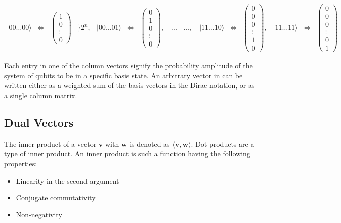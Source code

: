 \documentclass[12pt]{article}
\begin{document}
\begin{equation}
    \begin{array}{ccccccc}
    |00\ldots00\rangle & \Longleftrightarrow &
    \begin{pmatrix} 
    1 \\ 
    0 \\ 
    \vdots \\ 
    0
    \end{pmatrix} & \Bigg\} 2^n, &
    |00\ldots01\rangle & \Longleftrightarrow &
    \begin{pmatrix} 
    0 \\ 
    1 \\ 
    0 \\ 
    \vdots \\ 
    0
    \end{pmatrix}, \quad \ldots
    \end{array}

    \begin{array}{ccccccc}
    \ldots, \quad |11\ldots10\rangle & \Longleftrightarrow &
    \begin{pmatrix} 
    0 \\ 
    0 \\ 
    0 \\ 
    \vdots \\ 
    1 \\ 
    0
    \end{pmatrix}, &
    |11\ldots11\rangle & \Longleftrightarrow &
    \begin{pmatrix} 
    0 \\ 
    0 \\ 
    0 \\ 
    \vdots \\ 
    0 \\ 
    1
    \end{pmatrix}
    \end{array}
\end{equation}

Each entry in one of the column vectors signify the probability amplitude of the system of qubits to be in a specific basis state. An arbitrary vector in can be written either as a weighted sum of the basis vectors in the Dirac notation, or as a single column matrix.

\subsection{Dual Vectors}

\hspace*{0.5cm}The inner product of a vector \( \mathbf{v} \) with \( \mathbf{w} \) is denoted as \( \langle \mathbf{v}, \mathbf{w} \rangle \). Dot products are a type of inner product.
An inner product is such a function having the following properties:
\begin{itemize}[nosep]
    \item Linearity in the second argument
    \item Conjugate commutativity
    \item Non-negativity
\end{itemize} 
\end{document}
